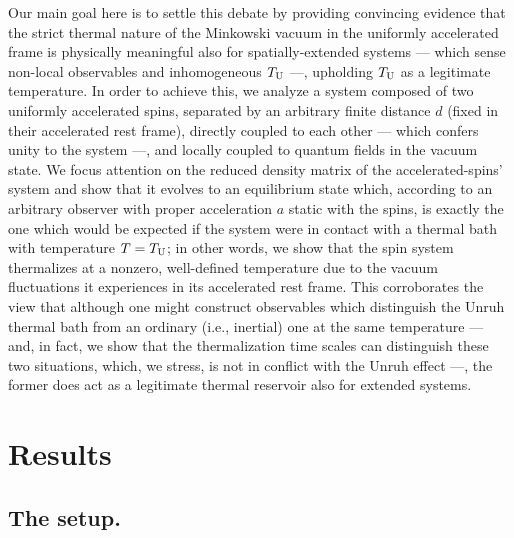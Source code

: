 \documentclass[]{nature}
\begin{document}
Our main goal here is to settle this debate by
providing convincing evidence that the strict thermal nature of the Minkowski vacuum in the uniformly accelerated frame
is physically meaningful also for spatially-extended systems --- which sense non-local observables
and inhomogeneous  $T_{\rm U}$ ---, 
upholding $T_{\rm U}$ as a legitimate temperature. In order to achieve this, we analyze  a
system composed of two uniformly accelerated spins, separated by an arbitrary finite distance $d$ (fixed in their accelerated rest frame),
 directly coupled to each  other --- which confers unity to the system ---, and locally coupled to  quantum  fields in the vacuum state.
We focus attention on the  reduced density matrix of the accelerated-spins' system and show that it evolves to an 
equilibrium state which, according to an arbitrary observer with proper acceleration $a$ static with the spins, 
is exactly the one which would be expected if the system were in contact with a thermal bath with 
temperature $T=T_{\rm U}$; in other words, we show that the spin system  thermalizes at a nonzero, well-defined temperature 
due to the vacuum fluctuations it experiences in its accelerated rest frame. This corroborates 
the view that although one might construct observables which distinguish the Unruh thermal bath
from an ordinary (i.e., inertial) one at the same temperature --- and, in fact, we show that the thermalization time scales can distinguish
these two situations, which, we stress, is  not in conflict with the Unruh effect ---,  
the former does act as a legitimate thermal reservoir also for extended systems.
    
\section{Results}

\subsection{The setup.}
\end{document}
